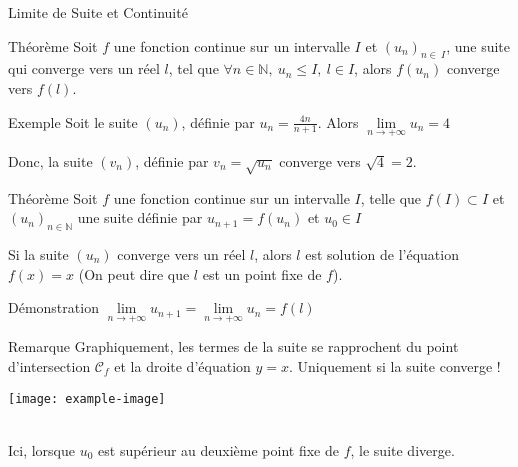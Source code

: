 \documentclass{cours}
\begin{document}
    \begin{Gpartie}{Limite de Suite et Continuité} 
        \begin{Spartie}{Théorème} 
            Soit $f$ une fonction continue sur un intervalle $I$ et $(u_n)_{n\in\ I}$, une suite qui converge vers un réel $l$, tel que $\forall n\in\mathbb{N},\ u_n\leq I,\ l\in I$, alors $f(u_n)$ converge vers $f(l)$.
            \begin{SSpartie}{Exemple} 
                Soit le suite $(u_n)$, définie par $u_n=\frac{4n}{n+1}$. Alors $\lim\limits_{n\to +\infty}u_n=4$
                
                Donc, la suite $(v_n)$, définie par $v_n=\sqrt{u_n}$ converge vers $\sqrt{4}=2$.
            \end{SSpartie}
        \end{Spartie}
        \begin{Spartie}{Théorème}
            Soit $f$ une fonction continue sur un intervalle $I$, telle que $f(I)\subset I$ et $(u_n)_{n\in\mathbb{N}}$ une suite définie par $u_{n+1}=f(u_n)$ et $u_0\in I$
            
            Si la suite $(u_n)$ converge vers un réel $l$, alors $l$ est solution de l'équation $f(x)=x$ (On peut dire que $l$ est un point fixe de $f$).
            \begin{SSpartie}{Démonstration} 
                $\lim\limits_{n\to +\infty}u_{n+1}=\lim\limits_{n\to +\infty}u_n=f(l)$
            \end{SSpartie}
            \begin{SSpartie}{Remarque} 
                Graphiquement, les termes de la suite se rapprochent du point d'intersection $\mathcal{C}_f$ et la droite d'équation $y=x$. Uniquement si la suite converge !
                \begin{center}
                        \texttt{[image: example-image]}
                    \parbox{\linewidth}{} \\[2ex]
                    Ici, lorsque $u_0$ est supérieur au deuxième point fixe de $f$, le suite diverge.
                \end{center}
            \end{SSpartie}
        \end{Spartie}
    \end{Gpartie}
\end{document}

